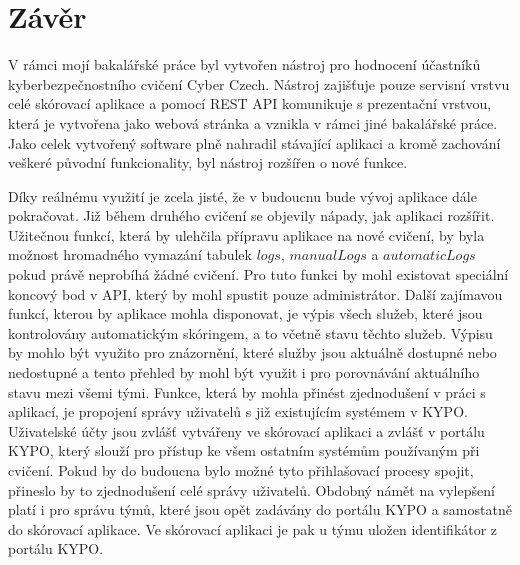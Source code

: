 \documentclass[
  digital, %
  twoside, %
  table,   %
  nolof,     %
  nolot,     %
]{fithesis3}
\begin{document}
\chapter{Závěr}


V rámci mojí bakalářské práce byl vytvořen nástroj pro hodnocení účastníků kyberbezpečnostního cvičení Cyber Czech. Nástroj zajišťuje pouze servisní vrstvu celé skórovací aplikace a pomocí REST API komunikuje s prezentační vrstvou, která je vytvořena jako webová stránka a vznikla v rámci jiné bakalářské práce. Jako celek vytvořený software plně nahradil stávající aplikaci a kromě zachování veškeré původní funkcionality, byl nástroj rozšířen o nové funkce.


Díky reálnému využití je zcela jisté, že v budoucnu bude vývoj aplikace dále pokračovat. Již během druhého cvičení se objevily nápady, jak aplikaci rozšířit. Užitečnou funkcí, která by ulehčila přípravu aplikace na nové cvičení, by byla možnost hromadného vymazání tabulek $logs$, $manualLogs$ a $automaticLogs$ pokud právě neprobíhá žádné cvičení. Pro tuto funkci by mohl existovat speciální koncový bod v API, který by mohl spustit pouze administrátor. Další zajímavou funkcí, kterou by aplikace mohla disponovat, je výpis všech služeb, které jsou kontrolovány automatickým skóringem, a to včetně stavu těchto služeb. Výpisu by mohlo být využito pro znázornění, které služby jsou aktuálně dostupné nebo nedostupné a tento přehled by mohl být využit i pro porovnávání aktuálního stavu mezi všemi tými. Funkce, která by mohla přinést zjednodušení v práci s aplikací, je propojení správy uživatelů s již existujícím systémem v KYPO. Uživatelské účty jsou zvlášť vytvářeny ve skórovací aplikaci a zvlášť v portálu KYPO, který slouží pro přístup ke všem ostatním systémům používaným při cvičení. Pokud by do budoucna bylo možné tyto přihlašovací procesy spojit, přineslo by to zjednodušení celé správy uživatelů. Obdobný námět na vylepšení platí i pro správu týmů, které jsou opět zadávány do portálu KYPO a samostatně do skórovací aplikace. Ve skórovací aplikaci je pak u týmu uložen identifikátor z portálu KYPO. 

\printbibliography[heading=bibintoc] %
\end{document}
